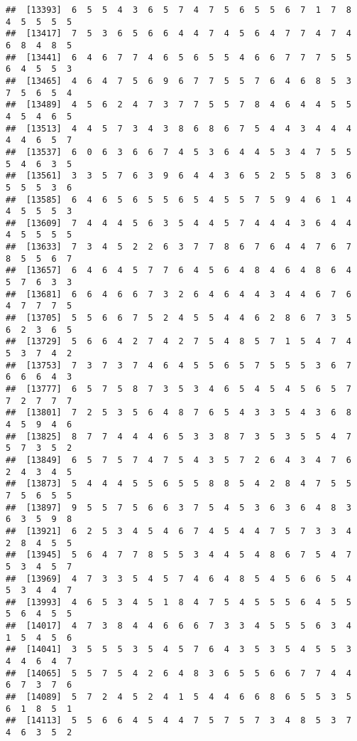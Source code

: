 \documentclass[
]{book}
\begin{document}
\begin{verbatim}
##  [13393]  6  5  5  4  3  6  5  7  4  7  5  6  5  5  6  7  1  7  8  4  5  5  5  5
##  [13417]  7  5  3  6  5  6  6  4  4  7  4  5  6  4  7  7  4  7  4  6  8  4  8  5
##  [13441]  6  4  6  7  7  4  6  5  6  5  5  4  6  6  7  7  7  5  5  6  4  5  5  3
##  [13465]  4  6  4  7  5  6  9  6  7  7  5  5  7  6  4  6  8  5  3  7  5  6  5  4
##  [13489]  4  5  6  2  4  7  3  7  7  5  5  7  8  4  6  4  4  5  5  4  5  4  6  5
##  [13513]  4  4  5  7  3  4  3  8  6  8  6  7  5  4  4  3  4  4  4  4  4  6  5  7
##  [13537]  6  0  6  3  6  6  7  4  5  3  6  4  4  5  3  4  7  5  5  5  4  6  3  5
##  [13561]  3  3  5  7  6  3  9  6  4  4  3  6  5  2  5  5  8  3  6  5  5  5  3  6
##  [13585]  6  4  6  5  6  5  5  6  5  4  5  5  7  5  9  4  6  1  4  4  5  5  5  3
##  [13609]  7  4  4  4  5  6  3  5  4  4  5  7  4  4  4  3  6  4  4  4  5  5  5  5
##  [13633]  7  3  4  5  2  2  6  3  7  7  8  6  7  6  4  4  7  6  7  8  5  5  6  7
##  [13657]  6  4  6  4  5  7  7  6  4  5  6  4  8  4  6  4  8  6  4  5  7  6  3  3
##  [13681]  6  6  4  6  6  7  3  2  6  4  6  4  4  3  4  4  6  7  6  4  7  7  7  5
##  [13705]  5  5  6  6  7  5  2  4  5  5  4  4  6  2  8  6  7  3  5  6  2  3  6  5
##  [13729]  5  6  6  4  2  7  4  2  7  5  4  8  5  7  1  5  4  7  4  5  3  7  4  2
##  [13753]  7  3  7  3  7  4  6  4  5  5  6  5  7  5  5  5  3  6  7  6  6  6  4  3
##  [13777]  6  5  7  5  8  7  3  5  3  4  6  5  4  5  4  5  6  5  7  7  2  7  7  7
##  [13801]  7  2  5  3  5  6  4  8  7  6  5  4  3  3  5  4  3  6  8  4  5  9  4  6
##  [13825]  8  7  7  4  4  4  6  5  3  3  8  7  3  5  3  5  5  4  7  5  7  3  5  2
##  [13849]  6  5  7  5  7  4  7  5  4  3  5  7  2  6  4  3  4  7  6  2  4  3  4  5
##  [13873]  5  4  4  4  5  5  6  5  5  8  8  5  4  2  8  4  7  5  5  7  5  6  5  5
##  [13897]  9  5  5  7  5  6  6  3  7  5  4  5  3  6  3  6  4  8  3  6  3  5  9  8
##  [13921]  6  2  5  3  4  5  4  6  7  4  5  4  4  7  5  7  3  3  4  2  8  4  5  5
##  [13945]  5  6  4  7  7  8  5  5  3  4  4  5  4  8  6  7  5  4  7  5  3  4  5  7
##  [13969]  4  7  3  3  5  4  5  7  4  6  4  8  5  4  5  6  6  5  4  5  3  4  4  7
##  [13993]  4  6  5  3  4  5  1  8  4  7  5  4  5  5  5  6  4  5  5  5  6  4  5  5
##  [14017]  4  7  3  8  4  4  6  6  6  7  3  3  4  5  5  5  6  3  4  1  5  4  5  6
##  [14041]  3  5  5  5  3  5  4  5  7  6  4  3  5  3  5  4  5  5  3  4  4  6  4  7
##  [14065]  5  5  7  5  4  2  6  4  8  3  6  5  5  6  6  7  7  4  4  6  7  3  7  6
##  [14089]  5  7  2  4  5  2  4  1  5  4  4  6  6  8  6  5  5  3  5  6  1  8  5  1
##  [14113]  5  5  6  6  4  5  4  4  7  5  7  5  7  3  4  8  5  3  7  4  6  3  5  2

\end{verbatim}
\end{document}
